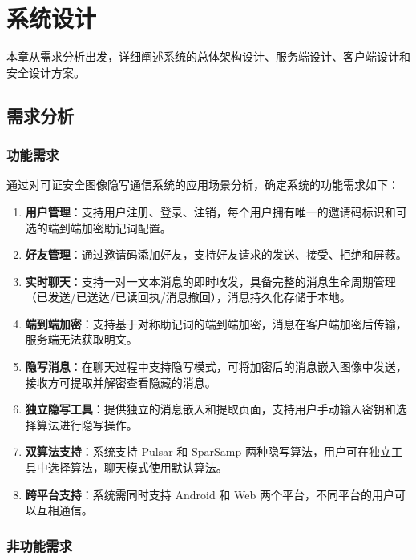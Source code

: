 \section{系统设计}\label{chap:design}

本章从需求分析出发，详细阐述系统的总体架构设计、服务端设计、客户端设计和安全设计方案。

\subsection{需求分析}

\subsubsection{功能需求}

通过对可证安全图像隐写通信系统的应用场景分析，确定系统的功能需求如下：

\begin{enumerate}
    \item \textbf{用户管理}：支持用户注册、登录、注销，每个用户拥有唯一的邀请码标识和可选的端到端加密助记词配置。
    \item \textbf{好友管理}：通过邀请码添加好友，支持好友请求的发送、接受、拒绝和屏蔽。
    \item \textbf{实时聊天}：支持一对一文本消息的即时收发，具备完整的消息生命周期管理（已发送/已送达/已读回执/消息撤回），消息持久化存储于本地。
    \item \textbf{端到端加密}：支持基于对称助记词的端到端加密，消息在客户端加密后传输，服务端无法获取明文。
    \item \textbf{隐写消息}：在聊天过程中支持隐写模式，可将加密后的消息嵌入图像中发送，接收方可提取并解密查看隐藏的消息。
    \item \textbf{独立隐写工具}：提供独立的消息嵌入和提取页面，支持用户手动输入密钥和选择算法进行隐写操作。
    \item \textbf{双算法支持}：系统支持 Pulsar 和 SparSamp 两种隐写算法，用户可在独立工具中选择算法，聊天模式使用默认算法。
    \item \textbf{跨平台支持}：系统需同时支持 Android 和 Web 两个平台，不同平台的用户可以互相通信。
\end{enumerate}

\subsubsection{非功能需求}


